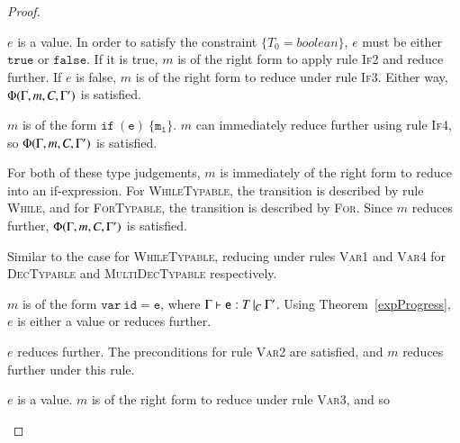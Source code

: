 \begin{proof}
\begin{case}[IfTypable]
	\begin{subcase}
	  $e$ is a value.
	  In order to satisfy the constraint $\{T_0 = boolean\}$, $e$ must be either
	  $\mathtt{true}$ or $\mathtt{false}$. If it is true, $m$ is of the right
	  form to apply rule \textsc{If2} and reduce further. If $e$ is false, $m$
	  is of the right form to reduce under rule \textsc{If3}. Either way,
	  $\Phi(\Gamma, m, C, \Gamma')$ is satisfied.
	\end{subcase}

  \end{case}

  \begin{case}[IfTypable2]\label{case:prog-iftypable2}

	$m$ is of the form $\mathtt{if\ (e)\ \{m_1\}}$. $m$ can immediately reduce
	further using rule \textsc{If4}, so $\Phi(\Gamma, m, C, \Gamma')$ is satisfied.

  \end{case}

  \begin{case}\label{case:prog-looptypable}

  	For both of these type judgements, $m$ is immediately of the right form to
  	reduce into an if-expression. For \textsc{WhileTypable}, the transition is
  	described by rule \textsc{While}, and for \textsc{ForTypable}, the
  	transition is described by \textsc{For}. Since $m$ reduces further,
  	$\Phi(\Gamma, m, C, \Gamma')$ is satisfied.

  \end{case}

  \begin{case}\label{case:prog-dectypable}

	Similar to the case for \textsc{WhileTypable}, reducing under rules
	\textsc{Var1} and \textsc{Var4} for \textsc{DecTypable} and
	\textsc{MultiDecTypable} respectively.

  \end{case}


  \begin{case}[DefTypable]\label{case:prog-deftypable}

	$m$ is of the form $\mathtt{var\ id=e}$, where $\Gamma{}\vdash\mathtt{e}: T\,|_C\:\Gamma'$. Using
	Theorem~\ref{expProgress}, $e$ is either a value or reduces further. 

	\begin{subcase}
	  $e$ reduces further.
	  The preconditions for rule \textsc{Var2} are satisfied, and $m$ reduces
	  further under this rule.
	\end{subcase}

	\begin{subcase}
	  $e$ is a value. 
	  $m$ is of the right form to reduce under rule \textsc{Var3}, and so
	\end{subcase}

  \end{case}

\end{proof}


